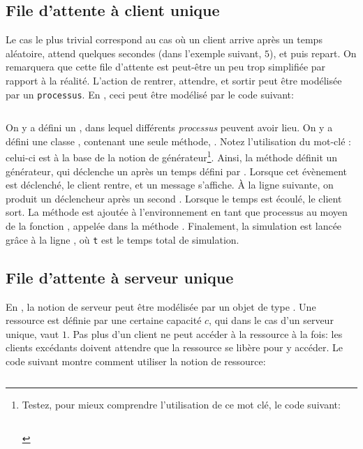         \subsection{File d'attente à client unique}
            Le cas le plus trivial correspond au cas où un client arrive après un temps aléatoire, attend quelques secondes (dans l'exemple suivant, $5$), et puis repart. On remarquera que cette file d'attente est peut-être un peu trop simplifiée par rapport à la réalité. L'action de rentrer, attendre, et sortir peut être modélisée par un \texttt{processus}. En , ceci peut être modélisé par le code suivant:
            \inputminted{python}{codes/client_unique.py}
            On y a défini un , dans lequel différents \textit{processus} peuvent avoir lieu. On y a défini une classe , contenant une seule méthode, . Notez l'utilisation du mot-clé : celui-ci est à la base de la notion de générateur\footnote{Testez, pour mieux comprendre l'utilisation de ce mot clé, le code suivant:
            \inputminted[fontsize=\tiny]{python}{codes/yield.py}}. Ainsi, la méthode  définit un générateur, qui déclenche un  après un temps défini par . Lorsque cet évènement est déclenché, le client rentre, et un message s'affiche. À la ligne suivante, on produit un déclencheur après un second . Lorsque le temps est écoulé, le client sort.
            La méthode  est ajoutée à l'environnement en tant que processus au moyen de la fonction , appelée dans la méthode . Finalement, la simulation est lancée grâce à la ligne , où \texttt{t} est le temps total de simulation.
            
        \subsection{File d'attente à serveur unique}
            En , la notion de serveur peut être modélisée par un objet de type . Une ressource est définie par une certaine capacité $c$, qui dans le cas d'un serveur unique, vaut $1$. Pas plus d'un client ne peut accéder à la ressource à la fois: les clients excédants doivent attendre que la ressource se libère pour y accéder. Le code suivant montre comment utiliser la notion de ressource:
            \inputminted{python}{codes/serveur_unique.py}

